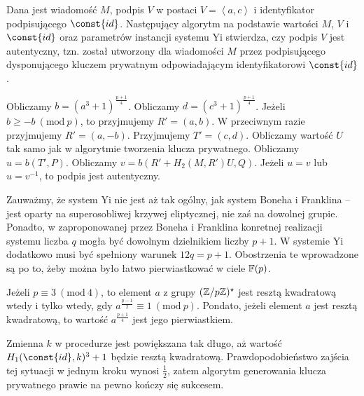 \begin{algorithm}
Dana jest wiadomość $M$,
podpis $V$ w postaci $V = \left\langle a, c \right\rangle$
i identyfikator podpisującego $\const{id}$.
Następujący algorytm na podstawie wartości $M$, $V$ i $\const{id}$
oraz parametrów instancji systemu Yi
stwierdza, czy podpis $V$ jest autentyczny,
tzn. został utworzony dla wiadomości $M$
przez podpisującego dysponującego kluczem prywatnym
odpowiadającym identyfikatorowi $\const{id}$.

\begin{codebox}
\li
Obliczamy $b = (a^3 + 1)^{\frac{p+1}{4}}$.
\li
Obliczamy $d = (c^3 + 1)^{\frac{p+1}{4}}$.
\li
Jeżeli $b \geq -b\ (\text{mod}\ p)$, to przyjmujemy $R' = (a, b)$.
\li
W przeciwnym razie przyjmujemy $R' = (a, -b)$.
\li
Przyjmujemy $T' = (c, d)$.
\li
Obliczamy wartość $U$ tak samo jak w algorytmie tworzenia klucza prywatnego.
\li
Obliczamy $u = b(T', P)$.
\li
Obliczamy $v = b(R' + H_2(M, R')U, Q)$.
\li
Jeżeli $u = v$ lub $u = v^{-1}$, to podpis jest autentyczny.
\end{codebox}
\end{algorithm}

\noindent
Zauważmy, że system Yi nie jest aż tak ogólny, jak system Boneha i Franklina --
jest oparty na superosobliwej krzywej eliptycznej,
nie zaś na dowolnej grupie.
Ponadto, w zaproponowanej przez Boneha i Franklina
konretnej realizacji systemu
liczba $q$ mogła być dowolnym dzielnikiem liczby $p+1$.
W systemie Yi dodatkowo musi być spełniony warunek $12q = p+1$.
Obostrzenia te wprowadzone są po to,
żeby można było łatwo pierwiastkować w ciele $\mathbb{F}(p)$.

\begin{remark}
Jeżeli $p \equiv 3\ (\text{mod}\ 4)$,
to element $a$ z grupy $(\mathbb{Z}/p\mathbb{Z})^\star$
jest resztą kwadratową wtedy i tylko wtedy,
gdy $a^{\frac{p-1}{2}} \equiv 1\ (\text{mod}\ p)$.
Pondato, jeżeli element $a$ jest resztą kwadratową,
to wartość $a^{\frac{p+1}{4}}$ jest jego pierwiastkiem.
\end{remark}

\begin{remark}
Zmienna $k$ w procedurze 
jest powiększana tak długo,
aż wartość $H_1(\const{id}, k)^3 + 1$ będzie resztą kwadratową.
Prawdopodobieństwo zajścia tej sytuacji w jednym kroku wynosi $\frac{1}{2}$,
zatem algorytm generowania klucza prywatnego
prawie na pewno kończy się sukcesem.
\end{remark}

